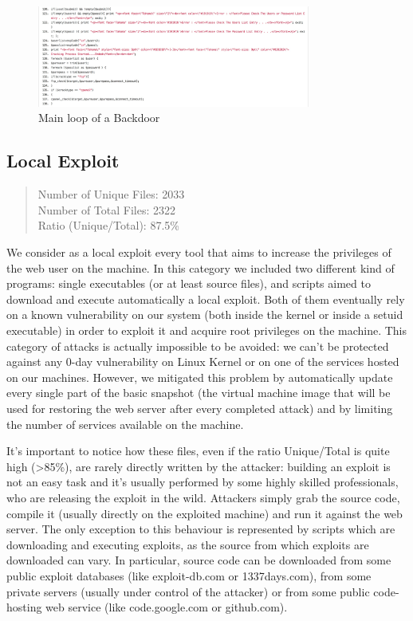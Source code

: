 \begin{figure}[H]
\centerline{\includegraphics[width=0.8\textwidth]{Images/bruteForcer.jpg}}
\caption{Main loop of a Backdoor\label{fig:bruteForcer}}
\end{figure}

\subsection{Local Exploit}

\begin{quote}
Number of Unique Files: 2033\\
Number of Total Files: 2322\\
Ratio (Unique/Total): 87.5\%
\end{quote}

We consider as a local exploit every tool that aims to increase the privileges of the web user on the machine. In this category we included two different kind of programs: single executables (or at least source files), and scripts aimed to download and execute automatically a local exploit. Both of them eventually rely on a known vulnerability on our system (both inside the kernel or inside a setuid executable) in order to exploit it and acquire root privileges on the machine.
This category of attacks is actually impossible to be avoided: we can't be protected against any 0-day vulnerability on Linux Kernel or on one of the services hosted on our machines. However, we mitigated this problem by automatically update every single part of the basic snapshot (the virtual machine image that will be used for restoring the web server after every completed attack) and by limiting the number of services available on the machine.

It's important to notice how these files, even if the ratio Unique/Total is quite high (>85\%), are rarely directly written by the attacker: building an exploit is not an easy task and it's usually performed by some highly skilled professionals, who are releasing the exploit in the wild. Attackers simply grab the source code, compile it (usually directly on the exploited machine) and run it against the web server. The only exception to this behaviour is represented by scripts which are downloading and executing exploits, as the source from which exploits are downloaded can vary. In particular, source code can be downloaded from some public exploit databases (like exploit-db.com or 1337days.com), from some private servers (usually under control of the attacker) or from some public code-hosting web service (like code.google.com or github.com).

